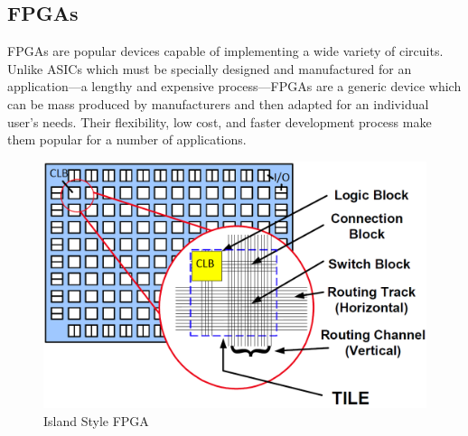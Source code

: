 \documentclass[12pt,drafta4paper,oneside]{memoir} %
\begin{document}
\subsection{\acsp{FPGA}}
\acp{FPGA} are popular devices capable of implementing a wide variety of circuits. Unlike \acp{ASIC} which must be specially designed and manufactured for an application---a lengthy and expensive process---\acp{FPGA} are a generic device which can be mass produced by manufacturers and then adapted for an individual user's needs. Their flexibility, low cost, and faster development process make them popular for a number of applications.


\begin{figure}
    \includegraphics[width=\textwidth]{images/fpga-arch.png}
    \caption{Island Style FPGA\cite{WiltonLecture}}
    \label{FPGAArch}
\end{figure}
\end{document}

